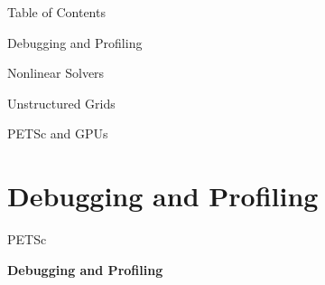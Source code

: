 





\begin{frame}{Table of Contents}
   \begin{block}{Debugging and Profiling} \end{block}
   \begin{block}{Nonlinear Solvers} \end{block}
   \begin{block}{Unstructured Grids} \end{block}
   \begin{block}{PETSc and GPUs} \end{block}
\end{frame}



%
%   



%
%
\section{Debugging and Profiling}
\begin{frame}{PETSc}
   \begin{center} \Large \textbf{Debugging and Profiling} \end{center}
\end{frame}

